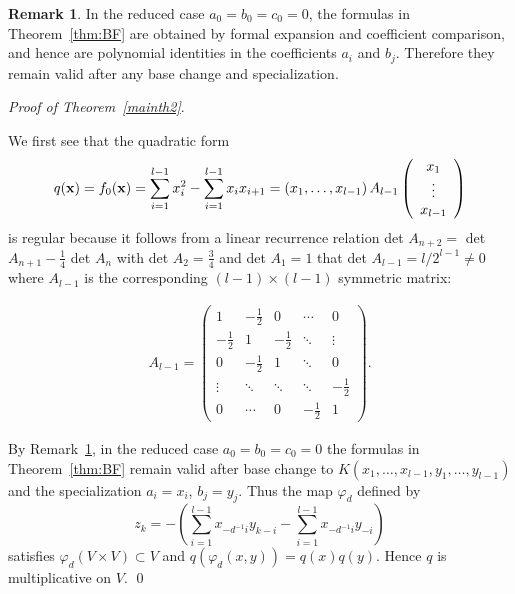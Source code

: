 \documentclass[a4paper, 11pt]{amsart}
\theoremstyle{plain}
\theoremstyle{definition}
\newtheorem{remark}[thm]{Remark}
\numberwithin{equation}{section}
\begin{document}
\begin{remark}\label{rem:base_change}
In the reduced case $a_0=b_0=c_0=0$, the formulas in Theorem~\ref{thm:BF}
are obtained by formal expansion and coefficient comparison, and hence are
polynomial identities in the coefficients $a_i$ and $b_j$.
Therefore they remain valid after any base change and specialization.
\end{remark}

{\it Proof of Theorem~\ref{mainth2}}. 

We first see that the quadratic form
\begin{align*}
q({\bf x})=f_0({\bf x})=\sum_{i=1}^{l-1}x_i^2-\sum_{i=1}^{l-1}x_ix_{i+1}
=(x_1,\ldots,x_{l-1})\,A_{l-1}
\left( 
\begin{array}{c}
x_1\\
\vdots\\
x_{l-1}
\end{array}
\right)
\end{align*}
is regular because it follows from a linear recurrence relation 
det\! $A_{n+2}=$ det\! $A_{n+1}-\frac{1}{4}$ det\! $A_n$ 
with det\! $A_2=\frac{3}{4}$ and det\! $A_1=1$ 
that det\! $A_{l-1}=l/2^{l-1}\neq 0$ 
where $A_{l-1}$ is the corresponding $(l-1)\times (l-1)$ symmetric matrix: 

\renewcommand{\arraystretch}{1.5}
\begin{align*}
A_{l-1}=\left( 
\begin{array}{ccccc}
1 & -\tfrac{1}{2} & 0 & \cdots & 0\\
-\tfrac{1}{2} & 1 & -\frac{1}{2} & \ddots & \vdots\\
0 & -\tfrac{1}{2} & 1 & \ddots & 0\\
\vdots & \ddots & \ddots & \ddots & -\tfrac{1}{2}\\
0 & \cdots & 0 & -\tfrac{1}{2} & 1
\end{array}
\right).
\end{align*}
\renewcommand{\arraystretch}{1.0}

By Remark~\ref{rem:base_change}, in the reduced case $a_0=b_0=c_0=0$
the formulas in Theorem~\ref{thm:BF} remain valid after base change to
$K(x_1,\ldots,x_{l-1},y_1,\ldots,y_{l-1})$ and the specialization
$a_i=x_i$, $b_j=y_j$.
Thus the map $\varphi_d$ defined by
\[
z_k=-\left(\sum_{i=1}^{l-1} x_{-d^{-1}i}y_{k-i}-\sum_{i=1}^{l-1} x_{-d^{-1}i}y_{-i}\right)
\]
satisfies $\varphi_d(V\times V)\subset V$ and $q(\varphi_d(x,y))=q(x)q(y)$.
Hence $q$ is multiplicative on $V$.
\qed
\end{document}
